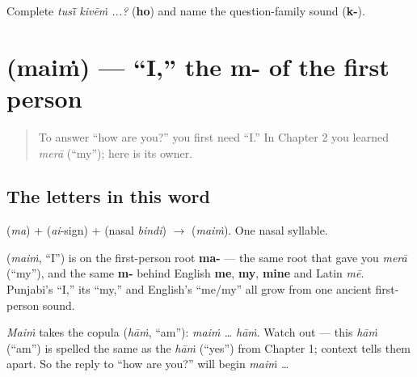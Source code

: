 \begin{tcolorbox}[breakable,colback=teal!4,colframe=teal!35!black,title={Before you move on}]
Complete \emph{tusī̃ kivēṁ ...?} (\textbf{ho}) and name the question-family sound (\textbf{k-}).
\end{tcolorbox}
\section[\texorpdfstring{\pa{ਮੈਂ} (maiṁ)}{ਮੈਂ (maiṁ)}]{ (maiṁ) — \textquotedblleft{}I,\textquotedblright{} the m- of the first person}

\label{lesson:PA-C03-main}



\begin{quote}
To answer \textquotedblleft{}how are you?\textquotedblright{} you first need \textquotedblleft{}I.\textquotedblright{} In Chapter 2 you learned \emph{merā} (\textquotedblleft{}my\textquotedblright{}); here is its owner.
\end{quote}

\subsection*{The letters in this word}
\textbf{} (\emph{ma}) + \textbf{} (\emph{ai}-sign) + \textbf{} (nasal \emph{bindi}) $\to$ \textbf{} (\emph{maiṁ}). One nasal syllable.

\begin{cousinweb}
\textbf{} (\emph{maiṁ}, \textquotedblleft{}I\textquotedblright{}) is on the first-person root \textbf{ma-} — the same root that gave you \emph{merā} (\textquotedblleft{}my\textquotedblright{}), and the same \textbf{m-} behind English \textbf{me}, \textbf{my}, \textbf{mine} and Latin \emph{mē}. Punjabi's \textquotedblleft{}I,\textquotedblright{} its \textquotedblleft{}my,\textquotedblright{} and English's \textquotedblleft{}me/my\textquotedblright{} all grow from one ancient first-person sound.
\end{cousinweb}

\begin{grammarlens}[title={Grammar Lens: the copula pairs with it}]
\emph{Maiṁ} takes the copula \textbf{} (\emph{hāṁ}, \textquotedblleft{}am\textquotedblright{}): \emph{maiṁ … hāṁ}. Watch out — this \emph{hāṁ} (\textquotedblleft{}am\textquotedblright{}) is spelled the same as the \emph{hāṁ} (\textquotedblleft{}yes\textquotedblright{}) from Chapter 1; context tells them apart. So the reply to \textquotedblleft{}how are you?\textquotedblright{} will begin \emph{maiṁ …}
\end{grammarlens}

